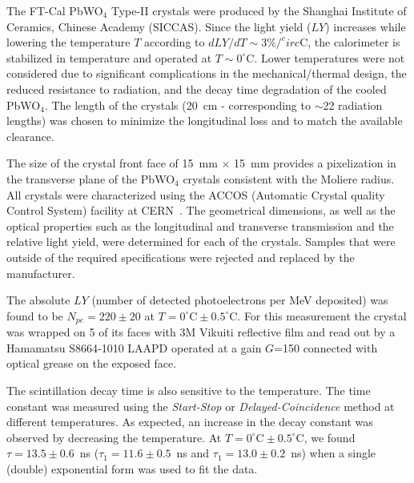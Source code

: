 The FT-Cal PbWO$_4$ Type-II crystals were produced by the Shanghai Institute of Ceramics, Chinese Academy
(SICCAS). Since the light yield ($LY$) increases while lowering the temperature $T$ according to
$dLY/dT \sim 3\%/^circ$C, the calorimeter is stabilized in temperature and operated at
$T \sim 0^\circ$C. Lower temperatures were not considered due to significant complications in the
mechanical/thermal design, the reduced resistance to radiation,  and the decay time degradation of the cooled
PbWO$_4$. The length of the crystals (20~cm - corresponding to $\sim$22 radiation lengths) was chosen to
minimize the longitudinal loss and to match the available clearance.

The size of the crystal front face of 15~mm $\times$ 15~mm provides a pixelization in the transverse plane of
the PbWO$_4$ crystals consistent with the Moliere radius. All crystals were characterized using the ACCOS
(Automatic Crystal quality Control System) facility at CERN~\cite{accos}. The geometrical dimensions, as well as the
optical properties such as the longitudinal and transverse transmission and the relative light yield, were determined
for each of the crystals. Samples that were outside of the required specifications were rejected and replaced by the
manufacturer. 

The absolute $LY$ (number of detected photoelectrons per MeV deposited) was found to be $N_{pe}=220\pm 20$
at $T=0^\circ\textrm{C}\pm 0.5^\circ\textrm{C}$. For this measurement the crystal was wrapped on 5 of its faces
with 3M Vikuiti reflective film and read out by a Hamamatsu S8664-1010 LAAPD operated at a gain $G$=150
connected with optical grease on the exposed face. 

The scintillation decay time is also sensitive to the temperature. The time constant was measured using the
{\it Start-Stop} or {\it Delayed-Coincidence} method at different temperatures. As expected, an increase in the
decay constant was observed by decreasing the temperature. At $T=0^\circ\textrm{C}\pm 0.5^\circ\textrm{C}$, we
found $\tau=13.5\pm 0.6$~ns ($\tau_1=11.6\pm 0.5$~ns and $\tau_1=13.0\pm 0.2$~ns) when a single (double)
exponential form was used to fit the data.

